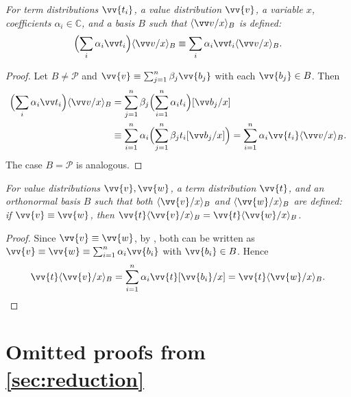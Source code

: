 \documentclass[runningheads,orivec,envcountsame,envcountsect]{llncs}
\newcommand\ansubst[2]{\ensuremath{\langle #1 \rangle_{#2}}}
\newcommand\AbsBasis{\ensuremath{\mathcal{P}}}
\def\C{\mathbb{C}}            %
\begin{document}
\begin{restatelemma}
  \itshape
  For term distributions $\vv{t_i}$, a value distribution $\vv{v}$, a
  variable $x$, coefficients $\alpha_i\in\C$, and a basis $B$ such that
  $\ansubst{\vv v/x}{B}$ is defined:
  \[
    \Bigl(\sum_i \alpha_i\vv t_i\Bigr)\ansubst{\vv v/x}{B}
    \equiv
    \sum_i \alpha_i\vv t_i \ansubst{\vv v/x}{B}.
  \]
\end{restatelemma}
\begin{proof}
  Let $B\neq\AbsBasis$ and
  $\vv{v}\equiv\sum_{j=1}^n\beta_j\vv{b_j}$ with each $\vv{b_j}\in B$.
  Then
  \begin{align*}
    \Bigl(\sum_i \alpha_i\vv t_i\Bigr)\ansubst{\vv v/x}{B}
    &= \sum_{j=1}^n \beta_j\Bigl(\sum_{i=1}^{n}\alpha_i t_i\Bigr)[\vv b_j/x]\\
    &\equiv \sum_{i=1}^{n}\alpha_i\Bigl(\sum_{j=1}^n\beta_j t_i[\vv b_j/x]\Bigr)
    = \sum_{i=1}^{n}\alpha_i\vv{t_i}\ansubst{\vv v/x}{B}.
  \end{align*}
  The case $B=\AbsBasis$ is analogous.
\end{proof}

\begin{restatelemma}
  \itshape
  For value distributions $\vv{v},\vv{w}$, a term distribution $\vv{t}$, and
  an orthonormal basis $B$ such that both
  $\ansubst{\vv{v}/x}{B}$ and $\ansubst{\vv{w}/x}{B}$ are defined:
  if $\vv{v}\equiv\vv{w}$, then
  $\vv{t}\ansubst{\vv{v}/x}{B}
  =\vv{t}\ansubst{\vv{w}/x}{B}$.
\end{restatelemma}
\begin{proof}
  Since $\vv{v}\equiv\vv{w}$, by
  ,
  both can be written as
  $\vv{v}\equiv\vv{w}\equiv\sum_{i=1}^{n}\alpha_i\vv{b_i}$ with
  $\vv{b_i}\in B$. Hence
  \[
    \vv{t}\ansubst{\vv{v}/x}{B}
    = \sum_{i=1}^{n}\alpha_i\vv{t}[\vv{b_i}/x]
    = \vv{t}\ansubst{\vv{w}/x}{B}.
  \]
\end{proof}

\section*{Omitted proofs from \ref{sec:reduction}}\label{sec:appendixB}
{}
\end{document}
